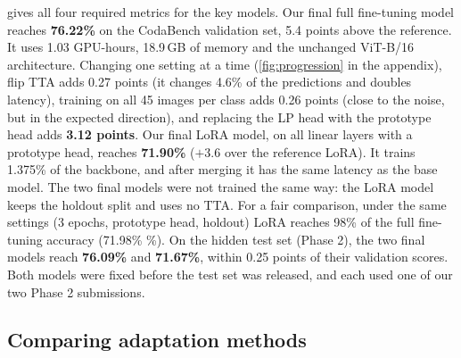  gives all four required metrics for the key models.
Our final full fine-tuning model reaches \textbf{76.22\%} on the CodaBench validation set, 5.4 points above the reference.
It uses 1.03 GPU-hours, 18.9\,GB of memory and the unchanged ViT-B/16 architecture.
Changing one setting at a time (\cref{fig:progression} in the appendix), flip TTA adds 0.27 points (it changes 4.6\% of the predictions and doubles latency), training on all 45 images per class adds 0.26 points (close to the noise, but in the expected direction), and replacing the LP head with the prototype head adds \textbf{3.12 points}.
Our final LoRA model, on all linear layers with a prototype head, reaches \textbf{71.90\%} ($+$3.6 over the reference LoRA).
It trains 1.375\% of the backbone, and after merging it has the same latency as the base model.
The two final models were not trained the same way: the LoRA model keeps the holdout split and uses no TTA.
For a fair comparison, under the same settings (3 epochs, prototype head, holdout) LoRA reaches 98\% of the full fine-tuning accuracy (71.98\% \%).
On the hidden test set (Phase 2), the two final models reach \textbf{76.09\%} and \textbf{71.67\%}, within 0.25 points of their validation scores.
Both models were fixed before the test set was released, and each used one of our two Phase 2 submissions.

\subsection{Comparing adaptation methods}
\label{sec:compare}


